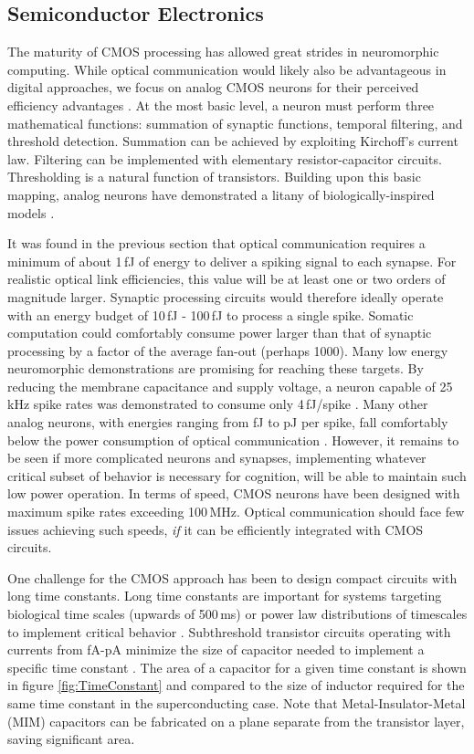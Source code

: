 \documentclass[twocolumn]{article}
\begin{document}
\subsection{Semiconductor Electronics}
The maturity of CMOS processing has allowed great strides in neuromorphic computing. While optical communication would likely also be advantageous in digital approaches, we focus on analog CMOS neurons for their perceived efficiency advantages \cite{rajendran2012specifications, mead1990neuromorphic}. At the most basic level, a neuron must perform three mathematical functions: summation of synaptic functions, temporal filtering, and threshold detection. Summation can be achieved by exploiting Kirchoff's current law. Filtering can be implemented with elementary resistor-capacitor circuits. Thresholding is a natural function of transistors. Building upon this basic mapping, analog neurons have demonstrated a litany of biologically-inspired models \cite{indiveri2011neuromorphic,lide2015}.

It was found in the previous section that optical communication requires a minimum of about 1\,fJ of energy to deliver a spiking signal to each synapse. For realistic optical link efficiencies, this value will be at least one or two orders of magnitude larger. Synaptic processing circuits would therefore ideally operate with an energy budget of 10\,fJ - 100\,fJ to process a single spike. Somatic computation could comfortably consume power larger than that of synaptic processing by a factor of the average fan-out (perhaps 1000). Many low energy neuromorphic demonstrations are promising for reaching these targets. By reducing the membrane capacitance and supply voltage, a neuron capable of 25\,kHz spike rates was demonstrated to consume only 4\,fJ/spike \cite{sourikopoulos20174}. Many other analog neurons, with energies ranging from fJ to pJ per spike, fall comfortably below the power consumption of optical communication \cite{indiveri2019importance}. However, it remains to be seen if more complicated neurons and synapses, implementing whatever critical subset of behavior is necessary for cognition, will be able to maintain such low power operation. In terms of speed, CMOS neurons have been designed with maximum spike rates exceeding 100\,MHz.\cite{}  Optical communication should face few issues achieving such speeds, \textit{if} it can be efficiently integrated with CMOS circuits.

One challenge for the CMOS approach has been to design compact circuits with long time constants. Long time constants are important for systems targeting biological time scales (upwards of 500\,ms) \cite{}  or power law distributions of timescales to implement critical behavior \cite{}. Subthreshold transistor circuits operating with currents from fA-pA minimize the size of capacitor needed to implement a specific time constant \cite{}. The area of a capacitor for a given time constant is shown in figure \ref{fig:TimeConstant} and compared to the size of inductor required for the same time constant in the superconducting case. Note that Metal-Insulator-Metal (MIM) capacitors can be fabricated on a plane separate from the transistor layer, saving significant area.
\end{document}
